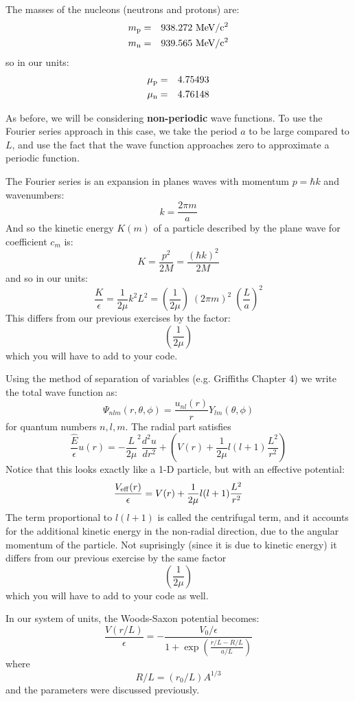 \documentclass[12pt]{article}
\begin{document}
The masses of the nucleons (neutrons and protons) are:
\begin{eqnarray*}
m_{\rm p} &=& 938.272~\rm MeV/c^2\\
m_{\rm n} &=& 939.565~\rm MeV/c^2\\
\end{eqnarray*}
so in our units:
\begin{eqnarray*}
\mu_{\rm p} &=& 4.75493\\
\mu_{\rm n} &=& 4.76148\\
\end{eqnarray*}

As before, we will be considering {\bf non-periodic} wave functions.
To use the Fourier series approach in this case, we take the period
$a$ to be large compared to $L$, and use the fact that the wave
function approaches zero to approximate a periodic function.


The Fourier series is an expansion in planes waves with momentum $p = \hbar k$ and wavenumbers:
$$k = \frac{2 \pi m}{a}$$
And so the kinetic energy $K(m)$ of a particle described by the plane wave for coefficient $c_m$ is:
$$ K = \frac{p^2}{2M} = \frac{(\hbar k)^2}{2M}$$
and so in our units:
$$ \frac{K}{\epsilon} = \frac{1}{2 \mu} k^2 L^2 = \left(\frac{1}{2\mu}\right) \; (2 \pi m)^2 \; \left( \frac{L}{a}\right)^2$$
This differs from our previous exercises by the factor:
$$\left(\frac{1}{2\mu}\right)$$
which you will have to add to your code.

Using the method of separation of variables (e.g. Griffiths Chapter 4) we write the total wave function as:
$$\Psi_{nlm}(r,\theta,\phi) = \frac{u_{nl}(r)}{r} Y_{lm}(\theta,\phi)$$
for quantum numbers $n,l,m$.  The radial part satisfies 
\begin{equation*}
  \frac{\hat{E}}{\epsilon} u(r) = -\frac{L}{2\mu}^2\frac{d^2 u}{dr^2} + \left(V(r)+ \frac{1}{2\mu}l(l+1) \frac{L^2}{r^2}\right)
\end{equation*}
Notice that this looks exactly like a 1-D particle, but with an effective potential:
$$\frac{V_{\rm eff}(r)}{\epsilon} = V(r) + \frac{1}{2\mu}l(l+1) \frac{L^2}{r^2}$$
The term proportional to $l(l+1)$ is called the centrifugal term, and
it accounts for the additional kinetic energy in the non-radial
direction, due to the angular momentum of the particle.  Not suprisingly (since it is due to kinetic energy) it differs from our previous exercise by the same factor
$$\left(\frac{1}{2\mu}\right)$$
which you will have to add to your code as well.


In our system of units, the Woods-Saxon potential becomes:
\begin{equation}
\frac{V(r/L)}{\epsilon} = -\frac{V_0/\epsilon}{1 + \exp\left( \frac{r/L-R/L}{a/L} \right)}
\end{equation}
where
$$R/L = (r_0/L) A^{1/3} $$
and the parameters were discussed previously.
\end{document}
